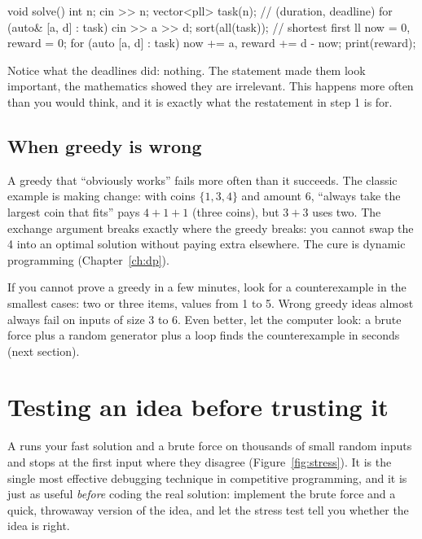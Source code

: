 \begin{code}
void solve() {
    int n;
    cin >> n;
    vector<pll> task(n);  // (duration, deadline)
    for (auto& [a, d] : task) cin >> a >> d;
    sort(all(task));  // shortest first
    ll now = 0, reward = 0;
    for (auto [a, d] : task) now += a, reward += d - now;
    print(reward);
}
\end{code}

Notice what the deadlines did: nothing. The statement made them look important, the mathematics showed they are irrelevant.
This happens more often than you would think, and it is exactly what the restatement in step 1 is for.

\subsection{When greedy is wrong}

A greedy that ``obviously works'' fails more often than it succeeds. The classic example is making change: with coins
$\{1, 3, 4\}$ and amount 6, ``always take the largest coin that fits'' pays $4 + 1 + 1$ (three coins), but $3 + 3$ uses two.
The exchange argument breaks exactly where the greedy breaks: you cannot swap the 4 into an optimal solution without paying
extra elsewhere. The cure is dynamic programming (Chapter~\ref{ch:dp}).

\begin{tip}
If you cannot prove a greedy in a few minutes, look for a counterexample in the smallest cases: two or three items, values
from 1 to 5. Wrong greedy ideas almost always fail on inputs of size 3 to 6. Even better, let the computer look: a brute
force plus a random generator plus a loop finds the counterexample in seconds (next section).
\end{tip}

\section[Testing an idea before trusting it]{Testing an idea before trusting it \hfill \silver}\label{sec:stress-idea}

A  runs your fast solution and a brute force on thousands of small random inputs and stops at the first
input where they disagree (Figure~\ref{fig:stress}). It is the single most effective debugging technique in competitive
programming, and it is just as useful \emph{before} coding the real solution: implement the brute force and a quick,
throwaway version of the idea, and let the stress test tell you whether the idea is right.

